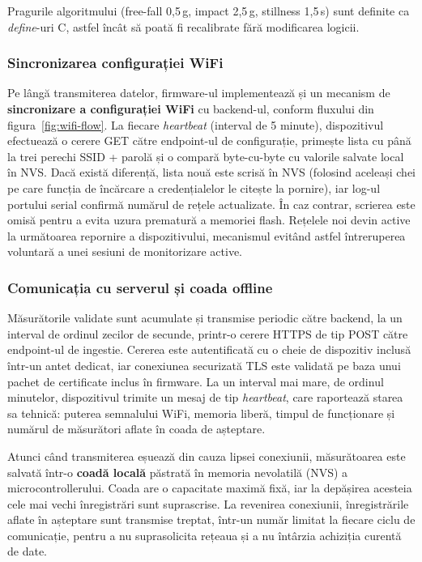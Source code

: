 \documentclass[12pt,a4paper]{article}
\begin{document}
Pragurile algoritmului (free-fall 0,5\,g, impact 2,5\,g, stillness 1,5\,s) sunt definite ca \textit{define}-uri C, astfel încât să poată fi recalibrate fără modificarea logicii.

\subsubsection{Sincronizarea configurației WiFi}

Pe lângă transmiterea datelor, firmware-ul implementează și un mecanism de \textbf{sincronizare a configurației WiFi} cu backend-ul, conform fluxului din figura~\ref{fig:wifi-flow}. La fiecare \textit{heartbeat} (interval de 5 minute), dispozitivul efectuează o cerere GET către endpoint-ul de configurație, primește lista cu până la trei perechi SSID + parolă și o compară byte-cu-byte cu valorile salvate local în NVS. Dacă există diferență, lista nouă este scrisă în NVS (folosind aceleași chei pe care funcția de încărcare a credențialelor le citește la pornire), iar log-ul portului serial confirmă numărul de rețele actualizate. În caz contrar, scrierea este omisă pentru a evita uzura prematură a memoriei flash. Rețelele noi devin active la următoarea repornire a dispozitivului, mecanismul evitând astfel întreruperea voluntară a unei sesiuni de monitorizare active.

\subsubsection{Comunicația cu serverul și coada offline}

Măsurătorile validate sunt acumulate și transmise periodic către backend, la un interval de ordinul zecilor de secunde, printr-o cerere HTTPS de tip POST către endpoint-ul de ingestie. Cererea este autentificată cu o cheie de dispozitiv inclusă într-un antet dedicat, iar conexiunea securizată TLS este validată pe baza unui pachet de certificate inclus în firmware. La un interval mai mare, de ordinul minutelor, dispozitivul trimite un mesaj de tip \textit{heartbeat}, care raportează starea sa tehnică: puterea semnalului WiFi, memoria liberă, timpul de funcționare și numărul de măsurători aflate în coada de așteptare.

Atunci când transmiterea eșuează din cauza lipsei conexiunii, măsurătoarea este salvată într-o \textbf{coadă locală} păstrată în memoria nevolatilă (NVS) a microcontrollerului. Coada are o capacitate maximă fixă, iar la depășirea acesteia cele mai vechi înregistrări sunt suprascrise. La revenirea conexiunii, înregistrările aflate în așteptare sunt transmise treptat, într-un număr limitat la fiecare ciclu de comunicație, pentru a nu suprasolicita rețeaua și a nu întârzia achiziția curentă de date.
\end{document}
